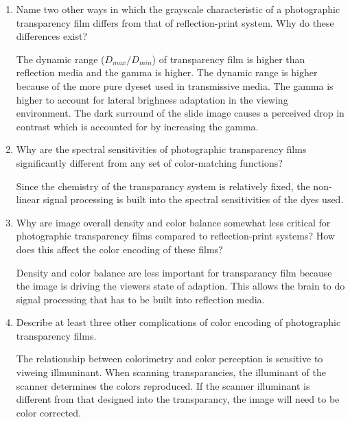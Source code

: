\documentclass{amsart}
\theoremstyle{definition}
\theoremstyle{remark}
\numberwithin{equation}{section}
\begin{document}
\begin{enumerate}
\item  Name two other ways in which the grayscale characteristic
of a photographic transparency film differs from that of
reflection-print system. Why do these differences exist?
\newline \par The dynamic range ($D_{max}/D_{min}$) of
transparency film is higher than reflection media and the gamma is
higher.  The dynamic range is higher because of the more pure
dyeset used in transmissive media.  The gamma is higher to account
for lateral brighness adaptation in the viewing environment.  The
dark surround of the slide image causes a perceived drop in
contrast which is accounted for by increasing the gamma.
\newline

\item  Why are the spectral sensitivities of photographic
transparency films significantly different from any set of
color-matching functions?
\newline \par Since the chemistry of the transparancy system is
relatively fixed, the non-linear signal processing is built into
the spectral sensitivities of the dyes used.
\newline

\item   Why are image overall density and color balance somewhat
less critical for photographic transparency films compared to
reflection-print systems? How does this affect the color encoding
of these films?
\newline \par Density and color balance are less important for
transparancy film because the image is driving the viewers state
of adaption. This allows the brain to do signal processing that
has to be built into reflection media. 
\newline

\item   Describe at least three other complications of color
encoding of photographic transparency films.
\newline \par The relationship between colorimetry and color
perception is sensitive to viweing illmuninant.  When scanning
transparancies, the illuminant of the scanner determines the
colors reproduced.  If the scanner illuminant is different from
that designed into the transparancy, the image will need to be
color corrected.


\end{enumerate}
\end{document}
